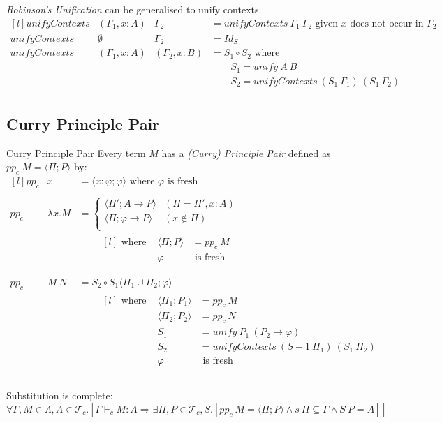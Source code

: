 \textit{Robinson's Unification} can be generalised to unify contexts.
\[\begin{matrix*}[l]
    unifyContexts & (\Gamma_1, x:A) & \Gamma_2 & = unifyContexts \ \Gamma_1 \ \Gamma_2 \text{ given }x \text{ does not occur in } \Gamma_2 \\
    unifyContexts & \emptyset & \Gamma_2 & = Id_S \\
    unifyContexts & (\Gamma_1, x:A) & (\Gamma_2, x:B) & = S_1 \circ S_2 \text{ where}\\
    & & & \qquad S_1 = unify \ A \ B \\
    & & & \qquad S_2 = unifyContexts \ (S_1 \ \Gamma_1) \ (S_1 \ \Gamma_2) \\
\end{matrix*}\]

\subsection{Curry Principle Pair}

\begin{definitionbox}{Curry Principle Pair}
    Every term $M$ has a \textit{(Curry) Principle Pair} defined as $pp_c \ M = \langle \Pi ; P \rangle$ by:
    \[\begin{matrix*}[l]
        pp_c & x & = \langle x: \varphi ; \varphi \rangle \text{ where } \varphi \text{ is fresh} \\
        \\
        pp_c & \lambda x. M & = \begin{cases}
            \langle \Pi' ; A \to P \rangle & (\Pi = \Pi', x:A) \\
            \langle \Pi; \varphi \to P \rangle & (x \not\in \Pi) \\
        \end{cases} \\
        & & \qquad \begin{matrix*}[l]
            \text{ where } & \langle \Pi; P \rangle &= pp_c \ M \\
            & \varphi & \text{ is fresh}  \\
        \end{matrix*} \\
        \\
        pp_c & M \ N & = S_2 \circ S_1 \langle \Pi_1 \cup \Pi_2 ; \varphi \rangle \\
        & & \qquad \begin{matrix*}[l]
            \text{ where } & \langle \Pi_1 ; P_1 \rangle & = pp_c \ M \\
            & \langle \Pi_2 ; P_2 \rangle & = pp_c \ N \\
            & S_1 & = unify \ P_1 \ (P_2 \to \varphi) \\
            & S_2 & = unifyContexts \ (S-1 \ \Pi_1) \ (S_1 \ \Pi_2) \\
            & \varphi & \text{ is fresh} \\
        \end{matrix*} \\
    \end{matrix*}\]
\end{definitionbox}

Substitution is complete:
\[\forall \Gamma, M \in \Lambda, A \in \mathcal{T}_c . [\Gamma \vdash_c M : A \Rightarrow \exists \Pi, P \in \mathcal{T}_c, S . [pp_c \ M = \langle \Pi ; P \rangle \land s \ \Pi \subseteq \Gamma \land S \ P = A]]\]
